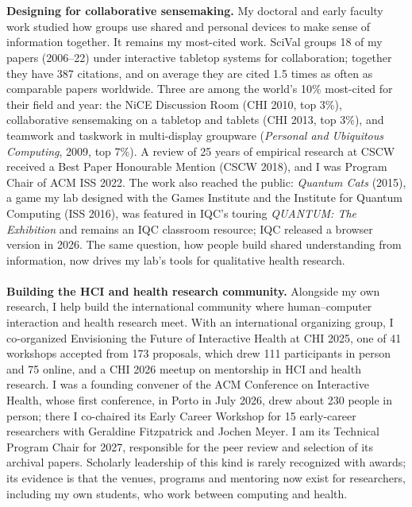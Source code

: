 \documentclass[11pt]{article}
\begin{document}
\\ \\
\textbf{Designing for collaborative sensemaking.} My doctoral and early faculty work studied how groups use shared and personal devices to make sense of information together. It remains my most-cited work. SciVal groups 18 of my papers (2006--22) under interactive tabletop systems for collaboration; together they have 387 citations, and on average they are cited 1.5 times as often as comparable papers worldwide. Three are among the world's 10\% most-cited for their field and year: the NiCE Discussion Room (CHI 2010, top 3\%), collaborative sensemaking on a tabletop and tablets (CHI 2013, top 3\%), and teamwork and taskwork in multi-display groupware (\emph{Personal and Ubiquitous Computing}, 2009, top 7\%). A review of 25 years of empirical research at CSCW received a Best Paper Honourable Mention (CSCW 2018), and I was Program Chair of ACM ISS 2022. The work also reached the public: \emph{Quantum Cats} (2015), a game my lab designed with the Games Institute and the Institute for Quantum Computing (ISS 2016), was featured in IQC's touring \emph{QUANTUM: The Exhibition} and remains an IQC classroom resource; IQC released a browser version in 2026. The same question, how people build shared understanding from information, now drives my lab's tools for qualitative health research.
\\ \\
\textbf{Building the HCI and health research community.} Alongside my own research, I help build the international community where human--computer interaction and health research meet. With an international organizing group, I co-organized Envisioning the Future of Interactive Health at CHI 2025, one of 41 workshops accepted from 173 proposals, which drew 111 participants in person and 75 online, and a CHI 2026 meetup on mentorship in HCI and health research. I was a founding convener of the ACM Conference on Interactive Health, whose first conference, in Porto in July 2026, drew about 230 people in person; there I co-chaired its Early Career Workshop for 15 early-career researchers with Geraldine Fitzpatrick and Jochen Meyer. I am its Technical Program Chair for 2027, responsible for the peer review and selection of its archival papers. Scholarly leadership of this kind is rarely recognized with awards; its evidence is that the venues, programs and mentoring now exist for researchers, including my own students, who work between computing and health.
\end{document}
